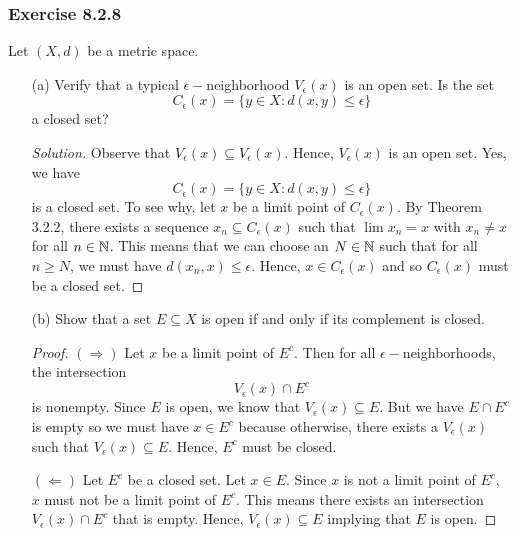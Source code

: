 \subsubsection{Exercise 8.2.8} Let \( (X,d) \) be a metric space.
\begin{enumerate}
    \item[(a)] Verify that a typical \( \epsilon- \)neighborhood \( V_{\epsilon }(x)  \) is an open set. Is the set 
        \[  C_{\epsilon }(x) = \{ y \in X : d(x,y) \leq \epsilon \}  \] a closed set? 
        \begin{proof}[Solution]
        Observe that \( V_{\epsilon }(x) \subseteq V_{\epsilon }(x)  \). Hence, \( V_{\epsilon }(x)  \) is an open set. 
        Yes, we have 
        \[  C_{\epsilon }(x) = \{ y \in X : d(x,y) \leq \epsilon \}  \] is a closed set. To see why, let \( x  \) be a limit point of \( C_{\epsilon }(x)  \). By Theorem 3.2.2, there exists a sequence \( x_{n} \subseteq C_{\epsilon }(x)  \) such that \( \lim x_{n} = x  \) with \( x_{n} \neq x  \) for all \( n \in \mathbb{N}  \). This means that we can choose an \( N \in \mathbb{N}  \) such that for all \( n \geq N  \), we must have \( d(x_{n}, x ) \leq \epsilon  \). Hence, \( x  \in C_{\epsilon }(x)  \) and so \( C_{\epsilon }(x)  \) must be a closed set.
        \end{proof}
    \item[(b)] Show that a set \( E \subseteq X  \) is open if and only if its complement is closed.
        \begin{proof}
        \( (\Rightarrow) \) Let \( x  \) be a limit point of \(E^{c} \). Then for all \( \epsilon- \)neighborhoods, the intersection 
        \[  V_{\epsilon }(x) \cap E^{c} \] is nonempty. Since \( E  \) is open, we know that 
        \( V_{\epsilon }(x) \subseteq E  \). But we have \( E \cap E^{c} \) is empty so we must have \( x \in E^{c}  \) because otherwise, there exists a \( V_{\epsilon }(x)  \) such that \( V_{\epsilon }(x) \subseteq E  \). Hence, \( E^{c} \) must be closed.  
       
        \( (\Leftarrow)\) Let \( E^{c} \) be a closed set. Let \( x \in E  \). Since \( x   \) is not a limit point of \( E^{c} \), \( x  \) must not be a limit point of \( E^{c} \). This means there exists an intersection \( V_{\epsilon }(x) \cap E^{c}  \)  that is empty. Hence, \( V_{\epsilon }(x) \subseteq E   \) implying that \( E  \) is open.
        \end{proof}
\end{enumerate}

